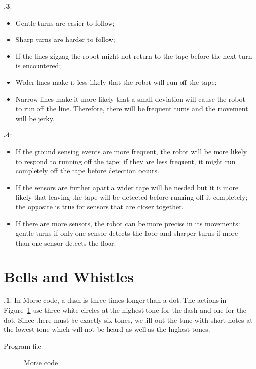 \documentclass[12pt,a4paper,english]{article}
\begin{document}
\textbf{\thesection.3}:
\begin{itemize}
\item Gentle turns are easier to follow; 
\item Sharp turns are harder to follow; 
\item If the lines zigzag the robot might not return to the tape before
the next turn is encountered;  
\item Wider lines make it less likely that the robot will run off the tape; 
\item Narrow lines make it more likely that a small deviation will cause
the robot to run off the line. Therefore, there will be frequent turns
and the movement will be jerky.
\end{itemize}


\textbf{\thesection.4}:
\begin{itemize}
\item If the ground sensing events are more frequent, the robot will be
more likely to respond to running off the tape; if they are less
frequent, it might run completely off the tape before detection occurs.
\item If the sensors are further apart a wider tape will be needed but
it is more likely that leaving the tape will be detected before running
off it completely; the opposite is true for sensors that are closer
together.
\item If there are more sensors, the robot can be more precise in its
movements: gentle turns if only one sensor detects the floor and sharper
turns if more than one sensor detects the floor.
\end{itemize}

\section{Bells and Whistles}

\textbf{\thesection.1}:
In Morse code, a dash is three times longer than a dot. The actions in
Figure~\ref{fig.morse} use three white circles at the highest tone for the
dash and one for the dot. Since there must be exactly six tones, we fill
out the tune with short notes at the lowest tone which will not be heard
as well as the highest tones.

{\raggedleft \hfill Program file }

\begin{figure}
\begin{center}
\caption{Morse code}\label{fig.morse}
\end{center}
\end{figure}
\end{document}
